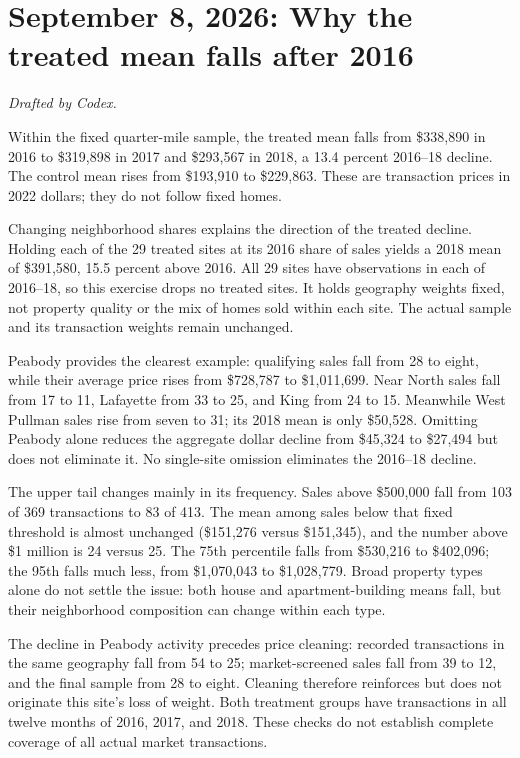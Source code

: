 \section*{September 8, 2026: Why the treated mean falls after 2016}
\textit{Drafted by Codex.}

Within the fixed quarter-mile sample, the treated mean falls from
\$338,890 in 2016 to \$319,898 in 2017 and \$293,567 in 2018, a 13.4 percent
2016--18 decline. The control mean rises from \$193,910 to \$229,863.
These are transaction prices in 2022 dollars; they do not follow fixed homes.

Changing neighborhood shares explains the direction of the treated decline.
Holding each of the 29 treated sites at its 2016 share of sales yields a 2018
mean of \$391,580, 15.5 percent above 2016. All 29 sites have observations in
each of 2016--18, so this exercise drops no treated sites. It holds geography
weights fixed, not property quality or the mix of homes sold within each site.
The actual sample and its transaction weights remain unchanged.

Peabody provides the clearest example: qualifying sales fall from 28 to eight,
while their average price rises from \$728,787 to \$1,011,699. Near North sales
fall from 17 to 11, Lafayette from 33 to 25, and King from 24 to 15.
Meanwhile West Pullman sales rise from seven to 31; its 2018 mean is only
\$50,528. Omitting Peabody alone reduces the aggregate dollar decline from
\$45,324 to \$27,494 but does not eliminate it. No single-site omission
eliminates the 2016--18 decline.

The upper tail changes mainly in its frequency. Sales above \$500,000 fall
from 103 of 369 transactions to 83 of 413. The mean among sales below that
fixed threshold is almost unchanged (\$151,276 versus \$151,345), and the
number above \$1 million is 24 versus 25. The 75th percentile falls from
\$530,216 to \$402,096; the 95th falls much less, from \$1,070,043 to
\$1,028,779. Broad property types alone do not settle the issue: both house
and apartment-building means fall, but their neighborhood composition can
change within each type.

The decline in Peabody activity precedes price cleaning: recorded transactions
in the same geography fall from 54 to 25; market-screened sales fall from 39
to 12, and the final sample from 28 to eight. Cleaning therefore reinforces
but does not originate this site's loss of weight. Both treatment groups
have transactions in all twelve months of 2016, 2017, and 2018. These checks
do not establish complete coverage of all actual market transactions.

